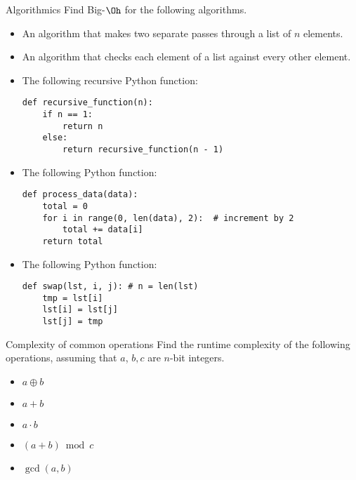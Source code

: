 \documentclass{practice}
\begin{document}
\begin{task}{Algorithmics}
  Find Big-$\Oh$ for the following algorithms.
  \begin{itemize}
    \item An algorithm that makes two separate passes through a list of $n$ elements.
    \item An algorithm that checks each element of a list against every other element.
    \item The following recursive Python function:
    \begin{lstlisting}
def recursive_function(n):
    if n == 1:
        return n
    else:
        return recursive_function(n - 1)
    \end{lstlisting}
    \item The following Python function:
    \begin{lstlisting}
def process_data(data):
    total = 0
    for i in range(0, len(data), 2):  # increment by 2
        total += data[i]
    return total
    \end{lstlisting}
    \item The following Python function:
    \begin{lstlisting}
def swap(lst, i, j): # n = len(lst)
    tmp = lst[i]
    lst[i] = lst[j]
    lst[j] = tmp
    \end{lstlisting}
  \end{itemize}
\end{task}

\begin{task}{Complexity of common operations}
  Find the runtime complexity of the following operations, assuming that $a$, $b, c$ are $n$-bit integers.
  \begin{itemize}
    \item $a \oplus b$
    \item $a + b$
    \item $a \cdot b$
    \item $(a + b) \bmod c$
    \item $\gcd(a, b)$
  \end{itemize}
\end{task}
\end{document}
